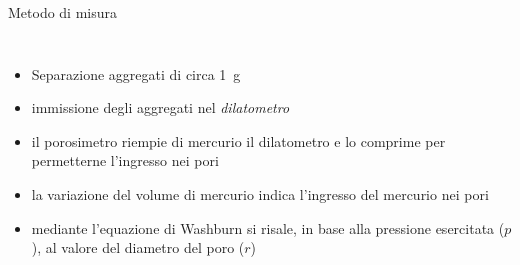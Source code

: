 \documentclass[10pt]{beamer}
\begin{document}
\begin{frame}{Metodo di misura}
  \begin{columns}
    \begin{itemize}[<+->]
    \item Separazione aggregati di circa \SI{1}{\gram}
    \item immissione degli aggregati nel \emph{dilatometro}
    \item il porosimetro riempie di mercurio il dilatometro e lo
      comprime per permetterne l'ingresso nei pori
    \item la variazione del volume di mercurio indica l'ingresso del
      mercurio nei pori 
    \item mediante l'equazione di Washburn si risale, in base alla
      pressione esercitata ($p$), al valore del diametro del poro ($r$)
    \end{itemize}
  \end{columns}
\end{frame}

\end{document}
